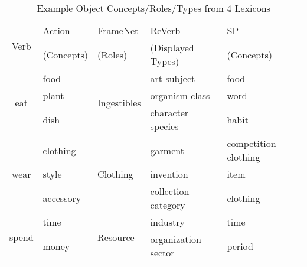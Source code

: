 \begin{table}[th]
\centering
\scriptsize
\caption{Example Object Concepts/Roles/Types from 4 Lexicons}
\label{snapshot}
\begin{tabular}{|c|l|l|l|l|}
\hline
\multirow{2}{*}{Verb} & Action     & FrameNet   & ReVerb & SP\\
 & (Concepts) & (Roles) & (Displayed Types)& (Concepts) \\
\hline \hline
\multirow{3}{*}{eat} & food & \multirow{3}{*}{Ingestibles} & art subject & food\\
      &  plant            &       & organism class & word\\
      &  dish           &       & character species & habit\\
      \hline
\multirow{3}{*}{wear} & clothing & \multirow{3}{*}{Clothing} & garment & competition clothing\\
      &  style &       & invention & item\\
      &  accessory &       & collection category & clothing \\
      \hline
\multirow{3}{*}{spend} & time  & \multirow{3}{*}{Resource} & industry & time\\
      &  money & 	&organization sector  & period\\

\end{tabular}
\end{table}
